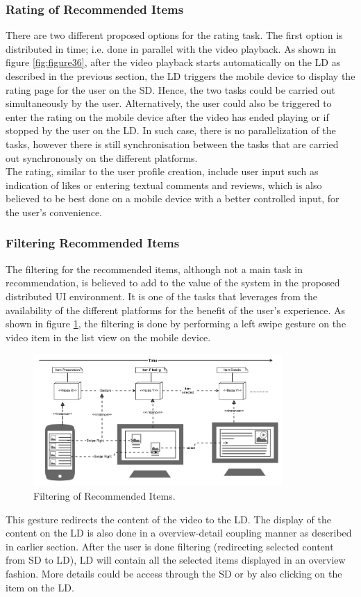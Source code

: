 \subsubsection{Rating of Recommended Items}
There are two different proposed options for the rating task. The first option is distributed in time; i.e. done in parallel with the video playback. As shown in figure \ref{fig:figure36}, after the video playback starts automatically on the LD as described in the previous section, the LD triggers the mobile device to display the rating page for the user on the SD. Hence, the two tasks could be carried out simultaneously by the user.
Alternatively, the user could also be triggered to enter the rating on the mobile device after the video has ended playing or if stopped by the user on the LD. In such case, there is no parallelization of the tasks, however there is still synchronisation between the tasks that are carried out synchronously on the different platforms.\\
The rating, similar to the user profile creation, include user input such as indication of likes or entering textual comments and reviews, which is also believed to be best done on a mobile device with a better controlled input, for the user's convenience.  

\subsubsection{Filtering Recommended Items}
The filtering for the recommended items, although not a main task in recommendation, is believed to add to the value of the system in the proposed distributed UI environment. It is one of the tasks that leverages from the availability of the different platforms for the benefit of the user's experience. As shown in figure \ref{fig:figure39}, the filtering is done by performing a left swipe gesture on the video item in the list view on the mobile device.
\begin{figure}[h!]
\includegraphics[width=0.85\textwidth, inner, center]{filtering}
\caption{Filtering of Recommended Items.}
\label{fig:figure39}
\end{figure}
This gesture redirects the content of the video to the LD. The display of the content on the LD is also done in a overview-detail coupling manner as described in earlier section. After the user is done filtering (redirecting selected content from SD to LD), LD will contain all the selected items displayed in an overview fashion. More details could be access through the SD or by also clicking on the item on the LD.  

